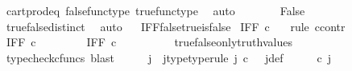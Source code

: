 \begin{isabellebody}
\ cart{\isacharunderscore}{\kern0pt}prod{\isacharunderscore}{\kern0pt}eq{}\ false{\isacharunderscore}{\kern0pt}func{\isacharunderscore}{\kern0pt}type\ true{\isacharunderscore}{\kern0pt}func{\isacharunderscore}{\kern0pt}type\ \isamarkupfalse%
\ auto\isanewline
\ \ \ \ \isamarkupfalse%
\ \isamarkupfalse%
\ False\isanewline
\ \ \ \ \ \ \isamarkupfalse%
\ true{\isacharunderscore}{\kern0pt}false{\isacharunderscore}{\kern0pt}distinct\ \isamarkupfalse%
\ auto\isanewline
\ \isamarkupfalse%
\isanewline
{}\isamarkupfalse%
%
\endisatagproof
{\isafoldproof}%
%
\isadelimproof
\isanewline
%
\endisadelimproof
\isanewline
{}\isamarkupfalse%
\ IFF{\isacharunderscore}{\kern0pt}false{\isacharunderscore}{\kern0pt}true{\isacharunderscore}{\kern0pt}is{\isacharunderscore}{\kern0pt}false{\isacharcolon}{\kern0pt}\isanewline
\ {\isachardoublequoteopen}IFF\ {\isasymcirc}\isactrlsub c\ {\isasymlangle}{\isasymf}{\isacharcomma}{\kern0pt}{\isasymt}{\isasymrangle}\ {\isacharequal}{\kern0pt}\ {\isasymf}{\isachardoublequoteclose}\isanewline
%
\isadelimproof
%
\endisadelimproof
%
\isatagproof
{}\isamarkupfalse%
{\isacharparenleft}{\kern0pt}rule\ ccontr{\isacharparenright}{\kern0pt}\isanewline
\ \ \isamarkupfalse%
\ {\isachardoublequoteopen}IFF\ {\isasymcirc}\isactrlsub c\ {\isasymlangle}{\isasymf}{\isacharcomma}{\kern0pt}{\isasymt}{\isasymrangle}\ {\isasymnoteq}\ {\isasymf}{\isachardoublequoteclose}\isanewline
\ \ \isamarkupfalse%
\ \isamarkupfalse%
\ {\isachardoublequoteopen}IFF\ {\isasymcirc}\isactrlsub c\ {\isasymlangle}{\isasymf}{\isacharcomma}{\kern0pt}{\isasymt}{\isasymrangle}\ \ {\isacharequal}{\kern0pt}\ {\isasymt}{\isachardoublequoteclose}\isanewline
\ \ \ \ \isamarkupfalse%
\ true{\isacharunderscore}{\kern0pt}false{\isacharunderscore}{\kern0pt}only{\isacharunderscore}{\kern0pt}truth{\isacharunderscore}{\kern0pt}values\ \isamarkupfalse%
\ {\isacharparenleft}{\kern0pt}typecheck{\isacharunderscore}{\kern0pt}cfuncs{\isacharcomma}{\kern0pt}\ blast{\isacharparenright}{\kern0pt}\isanewline
\ \ \isamarkupfalse%
\ \isamarkupfalse%
\ j\ \ j{\isacharunderscore}{\kern0pt}type{\isacharbrackleft}{\kern0pt}type{\isacharunderscore}{\kern0pt}rule{\isacharbrackright}{\kern0pt}{\isacharcolon}{\kern0pt}\ {\isachardoublequoteopen}j\ {\isasymin}\isactrlsub c\ {\isasymone}{\isasymCoprod}{\isasymone}{\isachardoublequoteclose}\ \ j{\isacharunderscore}{\kern0pt}def{\isacharcolon}{\kern0pt}\ \ {\isachardoublequoteopen}{\isacharparenleft}{\kern0pt}{\isasymlangle}{\isasymt}{\isacharcomma}{\kern0pt}\ {\isasymt}{\isasymrangle}\ {\isasymamalg}{\isasymlangle}{\isasymf}{\isacharcomma}{\kern0pt}\ {\isasymf}{\isasymrangle}{\isacharparenright}{\kern0pt}\ {\isasymcirc}\isactrlsub c\ j\ \ {\isacharequal}{\kern0pt}\ {\isasymlangle}{\isasymf}{\isacharcomma}{\kern0pt}{\isasymt}{\isasymrangle}{\isachardoublequoteclose}\isanewline

\end{isabellebody}
